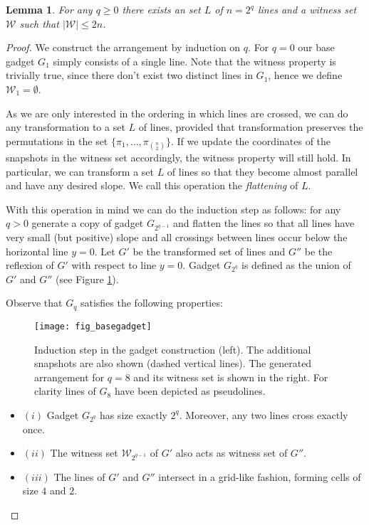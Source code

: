 \documentclass[11pt,a4paper]{article}
\newtheorem{lemma}[theorem]{Lemma}
\begin{document}
\begin{lemma}\label{ALB:basicgad}
For any $q\geq 0$ there exists an set $L$ of $n=2^q$ lines and a witness set $\mathcal{W}$ such that $|\mathcal{W}|\leq 2n$.
\end{lemma}
\begin{proof}
We construct the arrangement by induction on $q$. For $q=0$ our base gadget $G_1$ simply consists of a single line. Note that the witness property is trivially true, since there don't exist two distinct lines in $G_1$, hence we define $\mathcal{W}_1=\emptyset$.

As we are only interested in the ordering in which lines are crossed, we can do any transformation to a set $L$ of lines, provided that  transformation preserves the permutations in the set $\{\pi_1, \ldots, \pi_{n\choose 2}\}$. If we update the coordinates of the snapshots in the witness set accordingly, the witness property will still hold. In particular, we can transform a set $L$ of lines so that they become almost parallel and have any desired slope. We call this operation the {\em flattening} of $L$.

With this operation in mind we can do the induction step as follows: for any $q>0$ generate a copy of gadget $G_{2^{q-1}}$ and flatten the lines so that all lines have very small (but positive) slope and all crossings between lines occur below the horizontal line $y=0$. Let $G'$ be the transformed set of lines and $G''$ be the reflexion of $G'$ with respect to line $y=0$. Gadget $G_{2^q}$ is defined as the union of $G'$ and $G''$ (see Figure \ref{Afig_basegadget}).

Observe that $G_{q}$ satisfies the following properties:
\begin{figure}
   \begin{center}
     \texttt{[image: fig\_basegadget]}
     \caption{Induction step in the gadget construction (left). The additional snapshots are also shown  (dashed vertical lines). The generated arrangement for $q=8$ and its witness set is shown in the right. For clarity lines of $G_8$ have been depicted as pseudolines.}   \label{Afig_basegadget}
   \end{center}

\end{figure}

\begin{itemize}
\item $(i)$ Gadget $G_{2^q}$ has size exactly $2^q$. Moreover, any two lines cross exactly once.
\item $(ii)$ The witness set $\mathcal{W}_{2^{q-1}}$ of $G'$ also acts as witness set of $G''$.
\item $(iii)$ The lines of $G'$ and $G''$ intersect in a grid-like fashion, forming cells of size $4$ and $2$. \end{itemize}


\end{proof}
\end{document}
